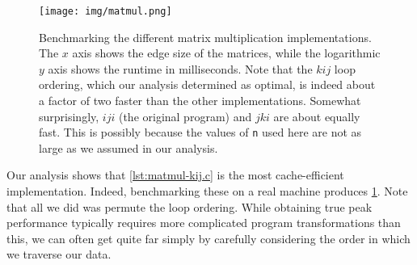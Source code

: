 \begin{figure}
  \centering
    \texttt{[image: img/matmul.png]}
    \caption{Benchmarking the different matrix multiplication
      implementations.  The $x$ axis shows the edge size of the
      matrices, while the logarithmic $y$ axis shows the runtime in
      milliseconds.  Note that the $kij$ loop ordering, which our
      analysis determined as optimal, is indeed about a factor of two
      faster than the other implementations.  Somewhat surprisingly,
      $iji$ (the original program) and $jki$ are about equally fast.
      This is possibly because the values of \texttt{n} used here are
      not as large as we assumed in our analysis.}
  \label{fig:matmul-graph}
\end{figure}

Our analysis shows that \cref{lst:matmul-kij.c} is the most
cache-efficient implementation.  Indeed, benchmarking these on a real
machine produces \cref{fig:matmul-graph}.  Note that all we did was
permute the loop ordering.  While obtaining true peak performance
typically requires more complicated program transformations than this,
we can often get quite far simply by carefully considering the order
in which we traverse our data.

